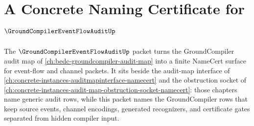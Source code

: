 \chapter{A Concrete Naming Certificate for $\GroundCompilerEventFlowAuditUp$}
\label{ch:concrete-instances-groundcompilereventflowaudit-namecert}

The $\GroundCompilerEventFlowAuditUp$ packet turns the GroundCompiler audit map of \autoref{ch:bedc-groundcompiler-audit-map} into a finite NameCert surface for event-flow and channel packets. It sits beside the audit-map interface of \autoref{ch:concrete-instances-auditmapinterface-namecert} and the obstruction socket of \autoref{ch:concrete-instances-audit-map-obstruction-socket-namecert}: those chapters name generic audit rows, while this packet names the GroundCompiler rows that keep source events, channel encodings, generated recognizers, and certificate gates separated from hidden compiler input.


